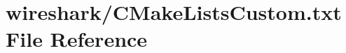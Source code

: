 \hypertarget{CMakeListsCustom_8txt}{}\section{wireshark/\+C\+Make\+Lists\+Custom.txt File Reference}
\label{CMakeListsCustom_8txt}
